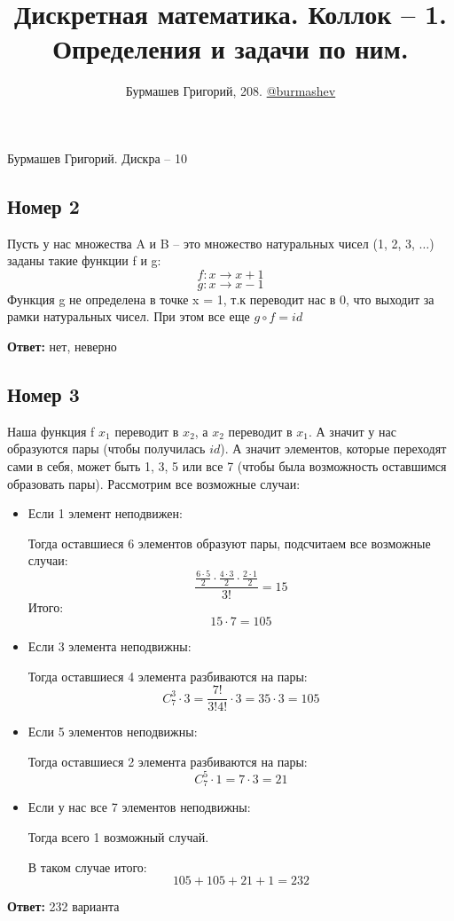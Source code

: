 \documentclass[a4paper,12pt]{article}
\author{Бурмашев Григорий, 208. \href{https://teleg.run/burmashev}{@burmashev}}
\title{Дискретная математика. Коллок -- 1. Определения и задачи по ним.}
\date{}
\begin{document}
\begin{center}
Бурмашев Григорий. Дискра -- 10
\end{center}
\subsection*{Номер 2}
Пусть у нас множества A и B -- это множество натуральных чисел (1, 2, 3, $\ldots$) заданы такие функции f и g:
\[
f: x \rightarrow x + 1
\]
\[
g:x \rightarrow x - 1
\]
Функция g не определена в точке x = 1, т.к переводит нас в 0, что выходит за рамки натуральных чисел. При этом все еще $g \circ  f = id$
\begin{center}
\textbf{Ответ:} нет, неверно 
\end{center}

\subsection*{Номер 3}
Наша функция f $x_1$ переводит в $x_2$, а $x_2$ переводит в $x_1$. А значит у нас образуются пары (чтобы получилась $id$). А значит элементов, которые переходят сами в себя, может быть 1, 3, 5 или все 7 (чтобы была возможность оставшимся образовать пары).
Рассмотрим все возможные случаи:
\begin{itemize}
\item  Если 1 элемент неподвижен:

Тогда оставшиеся 6 элементов образуют пары, подсчитаем все возможные случаи:
\[
\frac{\frac{6 \cdot 5}{2} \cdot \frac{4\cdot3}{2} \cdot \frac{2\cdot1}{2}}{3!} = 15 
\]
Итого:
\[
15 \cdot 7 = 105
\]
\item Если 3 элемента неподвижны:

Тогда оставшиеся 4 элемента разбиваются на пары:
\[
C_7^3 \cdot 3 = \frac{7!}{3!4!}  \cdot 3 = 35 \cdot 3 = 105
\]
\item Если 5 элементов неподвижны:

Тогда оставшиеся 2 элемента разбиваются на пары:
\[
C_7^5 \cdot 1 = 7 \cdot 3 = 21
\]
\item Если у нас все 7 элементов неподвижны:

Тогда всего 1 возможный случай.

В таком случае итого:
\[
105 + 105 + 21 + 1 = 232
\]
\end{itemize}
\begin{center}
\textbf{Ответ:} 232 варианта
\end{center}
\end{document}
